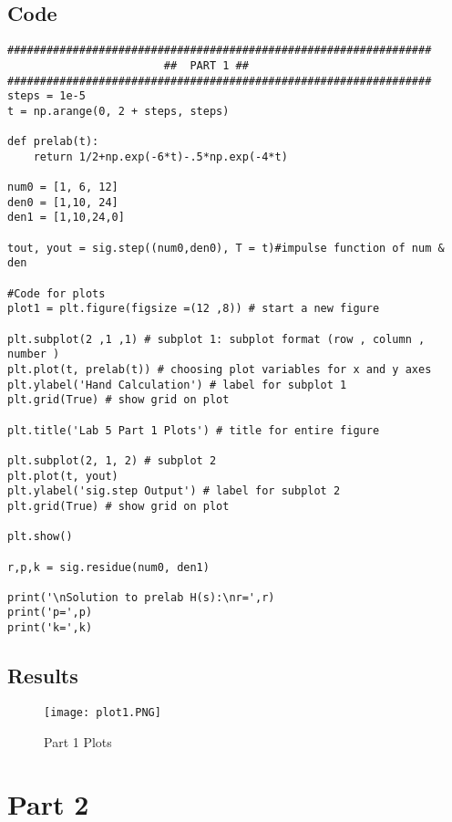 \subsection{Code}
\begin{scriptsize}
\begin{lstlisting}
#################################################################
                        ##  PART 1 ##
#################################################################
steps = 1e-5
t = np.arange(0, 2 + steps, steps) 

def prelab(t):
    return 1/2+np.exp(-6*t)-.5*np.exp(-4*t)

num0 = [1, 6, 12]
den0 = [1,10, 24]
den1 = [1,10,24,0]

tout, yout = sig.step((num0,den0), T = t)#impulse function of num & den 

#Code for plots
plot1 = plt.figure(figsize =(12 ,8)) # start a new figure

plt.subplot(2 ,1 ,1) # subplot 1: subplot format (row , column , number )
plt.plot(t, prelab(t)) # choosing plot variables for x and y axes
plt.ylabel('Hand Calculation') # label for subplot 1
plt.grid(True) # show grid on plot

plt.title('Lab 5 Part 1 Plots') # title for entire figure 

plt.subplot(2, 1, 2) # subplot 2
plt.plot(t, yout)
plt.ylabel('sig.step Output') # label for subplot 2
plt.grid(True) # show grid on plot

plt.show()

r,p,k = sig.residue(num0, den1)

print('\nSolution to prelab H(s):\nr=',r)
print('p=',p)
print('k=',k)

\end{lstlisting}
\end{scriptsize}

\subsection{Results}

 \begin{figure}[H]
   \centering
   \texttt{[image: plot1.PNG]}
   \caption{Part 1 Plots}
 \end{figure}




\section{Part 2}
